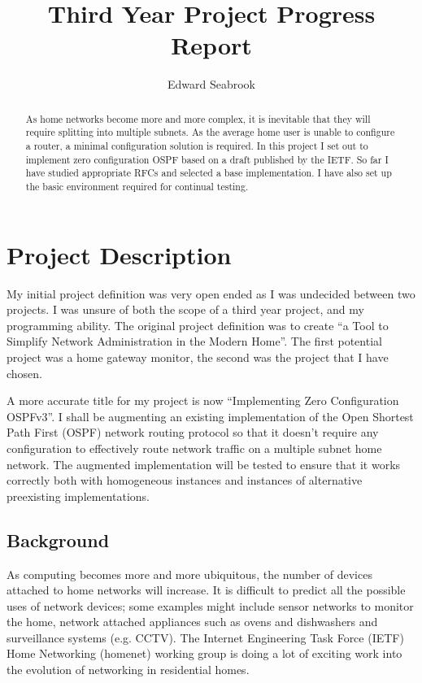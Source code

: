 \documentclass[12pt]{report}
\author{Edward Seabrook}
\title{Third Year Project Progress Report}
\begin{document}


\begin{abstract}
As home networks become more and more complex, it is inevitable that they will
require splitting into multiple subnets. As the average home user is unable to
configure a router, a minimal configuration solution is required. In this
project I set out to implement zero configuration OSPF based on a draft
published by the IETF. So far I have studied appropriate RFCs and selected a
base implementation. I have also set up the basic environment required for
continual testing.
\end{abstract}

\tableofcontents
\clearpage

\chapter{Project Description}
My initial project definition was very open ended as I was undecided between two
projects. I was unsure of both the scope of a third year project, and my
programming ability. The original project definition was to create ``a Tool to
Simplify Network Administration in the Modern Home''. The first potential
project was a home gateway monitor, the second was the project that I have
chosen. 

A more accurate title for my project is now ``Implementing Zero Configuration
OSPFv3''. I shall be augmenting an existing implementation of the Open Shortest
Path First (OSPF)  network routing
protocol so that it doesn't require any configuration to effectively route
network traffic on a multiple subnet home network. The augmented implementation
will be tested to ensure that it works correctly both with homogeneous instances
and instances of alternative preexisting implementations. 

\section{Background}
As computing becomes more and more ubiquitous, the number of devices attached to
home networks will increase. It is difficult to predict all the possible uses of
network devices; some examples might include sensor networks to monitor the
home, network attached appliances such as ovens and dishwashers and surveillance
systems (e.g. CCTV). The Internet Engineering Task Force (IETF)
 Home Networking (homenet)
 working group is doing a lot of exciting
work into the evolution of networking in residential homes\cite{homenet}.
\end{document}
